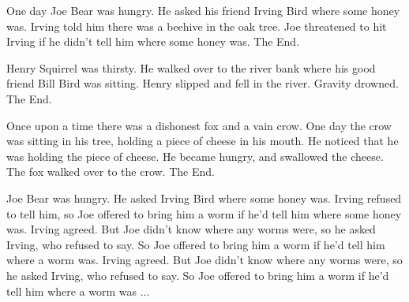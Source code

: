 \documentclass{beamer}
\begin{document}
\begin{huge}


One day Joe Bear was hungry. He asked his friend Irving Bird where some
honey was. Irving told him there was a beehive in the oak tree. Joe threatened
to hit Irving if he didn't tell him where some honey was. The End.

Henry Squirrel was thirsty. He walked over to the river bank where his
good friend Bill Bird was sitting. Henry slipped and fell in the
river. Gravity drowned. The End.

Once upon a time there was a dishonest fox and a vain crow. One day the
crow was sitting in his tree, holding a piece of cheese in his mouth. He
noticed that he was holding the piece of cheese. He became hungry, and
swallowed the cheese. The fox walked over to the crow. The End.


Joe Bear was hungry. He asked Irving Bird where some honey was. Irving
refused to tell him, so Joe offered to bring him a worm if he'd tell
him where some honey was.  Irving agreed. But Joe didn't know where
any worms were, so he asked Irving, who refused to say. So Joe offered
to bring him a worm if he'd tell him where a worm was.  Irving
agreed. But Joe didn't know where any worms were, so he asked Irving,
who refused to say. So Joe offered to bring him a worm if he'd tell
him where a worm was $\ldots$ 


\end{huge}
\end{document}
